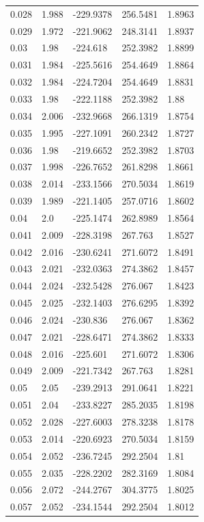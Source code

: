 \begin{tabular}{lllll}
0.028 & 1.988 & -229.9378 & 256.5481 & 1.8963 \\
0.029 & 1.972 & -221.9062 & 248.3141 & 1.8937 \\
0.03 & 1.98 & -224.618 & 252.3982 & 1.8899 \\
0.031 & 1.984 & -225.5616 & 254.4649 & 1.8864 \\
0.032 & 1.984 & -224.7204 & 254.4649 & 1.8831 \\
0.033 & 1.98 & -222.1188 & 252.3982 & 1.88 \\
0.034 & 2.006 & -232.9668 & 266.1319 & 1.8754 \\
0.035 & 1.995 & -227.1091 & 260.2342 & 1.8727 \\
0.036 & 1.98 & -219.6652 & 252.3982 & 1.8703 \\
0.037 & 1.998 & -226.7652 & 261.8298 & 1.8661 \\
0.038 & 2.014 & -233.1566 & 270.5034 & 1.8619 \\
0.039 & 1.989 & -221.1405 & 257.0716 & 1.8602 \\
0.04 & 2.0 & -225.1474 & 262.8989 & 1.8564 \\
0.041 & 2.009 & -228.3198 & 267.763 & 1.8527 \\
0.042 & 2.016 & -230.6241 & 271.6072 & 1.8491 \\
0.043 & 2.021 & -232.0363 & 274.3862 & 1.8457 \\
0.044 & 2.024 & -232.5428 & 276.067 & 1.8423 \\
0.045 & 2.025 & -232.1403 & 276.6295 & 1.8392 \\
0.046 & 2.024 & -230.836 & 276.067 & 1.8362 \\
0.047 & 2.021 & -228.6471 & 274.3862 & 1.8333 \\
0.048 & 2.016 & -225.601 & 271.6072 & 1.8306 \\
0.049 & 2.009 & -221.7342 & 267.763 & 1.8281 \\
0.05 & 2.05 & -239.2913 & 291.0641 & 1.8221 \\
0.051 & 2.04 & -233.8227 & 285.2035 & 1.8198 \\
0.052 & 2.028 & -227.6003 & 278.3238 & 1.8178 \\
0.053 & 2.014 & -220.6923 & 270.5034 & 1.8159 \\
0.054 & 2.052 & -236.7245 & 292.2504 & 1.81 \\
0.055 & 2.035 & -228.2202 & 282.3169 & 1.8084 \\
0.056 & 2.072 & -244.2767 & 304.3775 & 1.8025 \\
0.057 & 2.052 & -234.1544 & 292.2504 & 1.8012 \\

\end{tabular}
